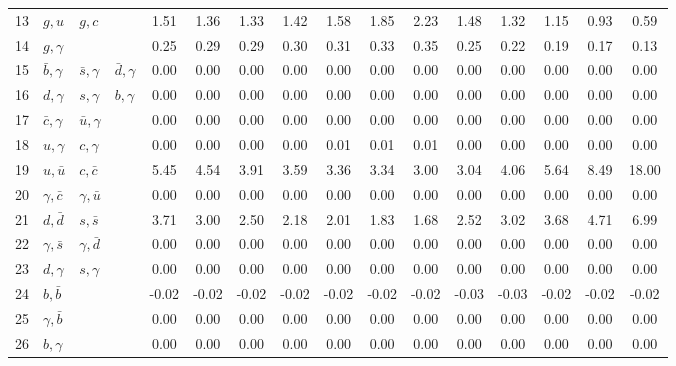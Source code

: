 \begin{tabularx}{\textwidth}{rXXX@{}S@{}S@{}S@{}S@{}S@{}S@{}S@{}S@{}S@{}S@{}S@{}S}
  13 & $g, u$          & $g, c$          &                 &  1.51 &  1.36 &  1.33 &  1.42 &  1.58 &  1.85 &  2.23 &  1.48 &  1.32 &  1.15 &  0.93 &  0.59 \\
  14 & $g,\gamma$      &                 &                 &  0.25 &  0.29 &  0.29 &  0.30 &  0.31 &  0.33 &  0.35 &  0.25 &  0.22 &  0.19 &  0.17 &  0.13 \\
  15 & $\bar b,\gamma$ & $\bar s,\gamma$ & $\bar d,\gamma$ &  0.00 &  0.00 &  0.00 &  0.00 &  0.00 &  0.00 &  0.00 &  0.00 &  0.00 &  0.00 &  0.00 &  0.00 \\
  16 & $d,\gamma$      & $s,\gamma$      & $b,\gamma$      &  0.00 &  0.00 &  0.00 &  0.00 &  0.00 &  0.00 &  0.00 &  0.00 &  0.00 &  0.00 &  0.00 &  0.00 \\
  17 & $\bar c,\gamma$ & $\bar u,\gamma$ &                 &  0.00 &  0.00 &  0.00 &  0.00 &  0.00 &  0.00 &  0.00 &  0.00 &  0.00 &  0.00 &  0.00 &  0.00 \\
  18 & $u,\gamma$      & $c,\gamma$      &                 &  0.00 &  0.00 &  0.00 &  0.00 &  0.01 &  0.01 &  0.01 &  0.00 &  0.00 &  0.00 &  0.00 &  0.00 \\
  19 & $u,\bar u$      & $c,\bar c$      &                 &  5.45 &  4.54 &  3.91 &  3.59 &  3.36 &  3.34 &  3.00 &  3.04 &  4.06 &  5.64 &  8.49 & 18.00 \\
  20 & $\gamma,\bar c$ & $\gamma,\bar u$ &                 &  0.00 &  0.00 &  0.00 &  0.00 &  0.00 &  0.00 &  0.00 &  0.00 &  0.00 &  0.00 &  0.00 &  0.00 \\
  21 & $d,\bar d$      & $s,\bar s$      &                 &  3.71 &  3.00 &  2.50 &  2.18 &  2.01 &  1.83 &  1.68 &  2.52 &  3.02 &  3.68 &  4.71 &  6.99 \\
  22 & $\gamma,\bar s$ & $\gamma,\bar d$ &                 &  0.00 &  0.00 &  0.00 &  0.00 &  0.00 &  0.00 &  0.00 &  0.00 &  0.00 &  0.00 &  0.00 &  0.00 \\
  23 & $d,\gamma$      & $s,\gamma$      &                 &  0.00 &  0.00 &  0.00 &  0.00 &  0.00 &  0.00 &  0.00 &  0.00 &  0.00 &  0.00 &  0.00 &  0.00 \\
  24 & $b,\bar b$      &                 &                 & -0.02 & -0.02 & -0.02 & -0.02 & -0.02 & -0.02 & -0.02 & -0.03 & -0.03 & -0.02 & -0.02 & -0.02 \\ 
  25 & $\gamma,\bar b$ &                 &                 &  0.00 &  0.00 &  0.00 &  0.00 &  0.00 &  0.00 &  0.00 &  0.00 &  0.00 &  0.00 &  0.00 &  0.00 \\
  26 & $b,\gamma$      &                 &                 &  0.00 &  0.00 &  0.00 &  0.00 &  0.00 &  0.00 &  0.00 &  0.00 &  0.00 &  0.00 &  0.00 &  0.00 \\

\end{tabularx}
